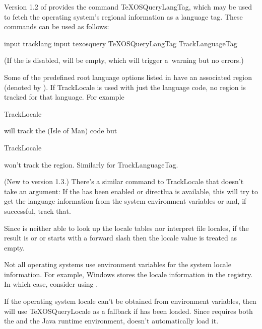 \documentclass[titlepage=false,oneside,
 fontsize=12pt,captions=tableheading]{scrbook}
\newcommand{\fnregion}{\fnsym*{2}}
\begin{document}
Version 1.2 of  provides the command \gls{TeXOSQueryLangTag},
which may be used to fetch the operating system's regional
information as a language tag. These commands can be used as
follows:
\begin{codebox}
\gls{input} tracklang 
\gls{input} texosquery 
\codepar
\gls{TeXOSQueryLangTag}
\gls{TrackLanguageTag}
\end{codebox}
(If the  is disabled,  will be empty, which
will trigger a~warning but no errors.)

Some of the predefined root language options listed
in  have an associated region
(denoted by \fnregion).
If \gls{TrackLocale} is used with just the language  code,
no region is tracked for that language. For example
\begin{codebox}
\gls{TrackLocale}
\end{codebox}
will track the  (Isle of Man)  code but
\begin{codebox}
\gls{TrackLocale}
\end{codebox}
won't track the region.
Similarly for \gls{TrackLanguageTag}.

(New to version 1.3.)
There's a similar command to \gls{TrackLocale} that doesn't take an argument:
If the  has been enabled or \gls{directlua} is
available, this will try to get the language information from the
system environment variables  or  and, if
successful, track that.

Since  is neither able to look up the  locale
tables nor interpret file locales, if the result is  or
 or starts with a forward slash \code{/} then
the locale value is treated as empty.

\begin{important}
Not all operating systems use environment variables for
the system locale information. For example, Windows stores the
locale information in the registry. In which case, consider
using .
\end{important}

If the operating system locale can't be obtained from environment variables, then
 will use \gls{TeXOSQueryLocale} as a fallback if
 has been loaded. Since  requires
both the  and the Java runtime environment,
 doesn't automatically load it.
\end{document}

